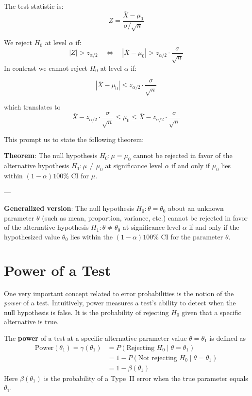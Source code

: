 \documentclass[twoside]{book}
\begin{document}
The test statistic is:
\[
Z = \dfrac{\overline{X} - \mu_0}{\sigma / \sqrt{n}}
\]

We reject $H_0$ at level $\alpha$ if:
\[
|Z| > z_{\alpha/2}
\quad \Longleftrightarrow \quad
|\overline{X} - \mu_0| > z_{\alpha/2} \cdot \frac{\sigma}{\sqrt{n}}
\]
In contrast we cannot reject  $H_0$ at level $\alpha$ if:

$$|\overline{X} - \mu_0| \leq z_{\alpha/2} \cdot \frac{\sigma}{\sqrt{n}}$$

which translates to
$$\overline{X} - z_{\alpha/2} \cdot \dfrac{\sigma}{\sqrt{n}} \leq  \mu_0 \leq \overline{X} - z_{\alpha/2} \cdot \dfrac{\sigma}{\sqrt{n}}$$

This prompt us to state the following theorem:

\begin{textbox}
\textbf{Theorem}: The null hypothesis $H_0:\mu = \mu_0$ cannot be rejected in favor of the alternative hypothesis $H_1:\mu \neq \mu_0$ at significance level $\alpha$ if and only if $\mu_0$ lies within $(1-\alpha)100\%$ CI for $\mu$.

---

\textbf{Generalized version}: The null hypothesis $H_0: \theta = \theta_0$ about an unknown parameter $\theta$ (such as mean, proportion, variance, etc.) cannot be rejected in favor of the alternative hypothesis $H_1: \theta \ne \theta_0$ at significance level $\alpha$ if and only if the hypothesized value $\theta_0$ lies within the $(1 - \alpha)100\%$ CI for the parameter $\theta$.
\end{textbox}

\section{Power of a Test}

One very important concept related to error probabilities is the notion of the \emph{power} of a test. Intuitively, power measures a test's ability to detect when the null hypothesis is false. It is the probability of rejecting $ H_0 $ given that a speciﬁc alternative is true.

\begin{textbox}
	The \textbf{power} of a test at a specific alternative parameter value $\theta=\theta_1$ is defined as
	\begin{align*}
	\mathrm{Power}(\theta_1)=\gamma(\theta_1) &= P(\text{Rejecting }H_0\mid \theta = \theta_1)\\
	&=1-P(\text{Not rejecting }H_0\mid \theta = \theta_1)\\
	& = 1 - \beta(\theta_1)
	\end{align*}
Here $\beta(\theta_1)$ is the probability of a Type~II error when the true parameter equals $\theta_1$.
\end{textbox}
\bigskip
\end{document}
